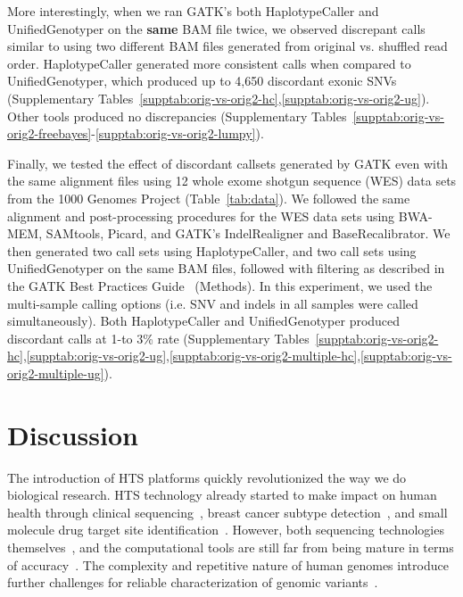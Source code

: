 \documentclass[10pt,a4paper]{article}
\begin{document}
More interestingly, when we ran GATK's both HaplotypeCaller and UnifiedGenotyper on the {\bf same} BAM file twice, we observed discrepant calls similar to using two different BAM files generated from original vs. shuffled read order. HaplotypeCaller generated more consistent calls when compared to UnifiedGenotyper, which produced up to 4,650 discordant exonic SNVs (Supplementary Tables~\ref{supptab:orig-vs-orig2-hc},\ref{supptab:orig-vs-orig2-ug}). Other tools produced no discrepancies (Supplementary Tables~\ref{supptab:orig-vs-orig2-freebayes}-\ref{supptab:orig-vs-orig2-lumpy}).

Finally, we tested the effect of discordant callsets generated by GATK even with the same alignment files using 12 whole exome shotgun sequence (WES) data sets from the 1000 Genomes Project (Table~\ref{tab:data}). We followed the same alignment and post-processing procedures for the WES data sets using BWA-MEM, SAMtools, Picard, and GATK's IndelRealigner and BaseRecalibrator. We then generated two call sets using HaplotypeCaller, and two call sets using UnifiedGenotyper on the same BAM files, followed with filtering as described in the GATK Best Practices Guide~\cite{VanderAuwera2013} (Methods). In this experiment, we used the multi-sample calling options (i.e. SNV and indels in all samples were called simultaneously). Both HaplotypeCaller and UnifiedGenotyper produced discordant calls at 1-to 3\% rate
(Supplementary Tables~\ref{supptab:orig-vs-orig2-hc},\ref{supptab:orig-vs-orig2-ug},\ref{supptab:orig-vs-orig2-multiple-hc},\ref{supptab:orig-vs-orig2-multiple-ug}). 

\section{Discussion}

The introduction of HTS platforms  quickly revolutionized the way we do biological research\cite{Mardis2008,Metzker2010}. HTS technology  already started to make impact on human health
through clinical sequencing~\cite{Biesecker2009}, breast cancer subtype detection~\cite{Bosdet2013}, and small molecule drug target site identification~\cite{Rodriguez2014}. However, both sequencing technologies themselves~\cite{Kavak2015}, and the computational tools are still far from being mature in terms of accuracy~\cite{Alkan2011,Nielsen2011}. The complexity and repetitive nature of human genomes introduce further challenges for reliable characterization of genomic variants~\cite{Treangen2012}.
\end{document}

